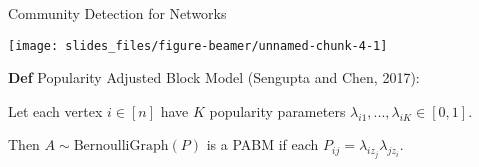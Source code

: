 \documentclass[
  ignorenonframetext,
]{beamer}
\begin{document}
\begin{frame}{Community Detection for Networks}
\protect\hypertarget{community-detection-for-networks}{}
\newcommand{\diag}{\text{diag}}
\newcommand{\tr}{\text{Tr}}
\newcommand{\blockdiag}{\text{blockdiag}}
\newcommand{\indep}{\stackrel{\text{ind}}{\sim}}
\newcommand{\iid}{\stackrel{\text{iid}}{\sim}}
\newcommand{\Bernoulli}{\text{Bernoulli}}
\newcommand{\Betadist}{\text{Beta}}
\newcommand{\BG}{\text{BernoulliGraph}}
\newcommand{\Cat}{\text{Categorical}}
\newcommand{\Uniform}{\text{Uniform}}
\newcommand{\RDPG}{\text{RDPG}}
\newcommand{\GRDPG}{\text{GRDPG}}
\newcommand{\PABM}{\text{PABM}}

\begin{center}\texttt{[image: slides\_files/figure-beamer/unnamed-chunk-4-1]} \end{center}

\textbf{Def} Popularity Adjusted Block Model (Sengupta and Chen, 2017):

Let each vertex \(i \in [n]\) have \(K\) popularity parameters
\(\lambda_{i1}, ..., \lambda_{iK} \in [0, 1]\).

Then \(A \sim \text{BernoulliGraph}(P)\) is a PABM if each
\(P_{ij} = \lambda_{i z_j} \lambda_{j z_i}\).
\end{frame}
\end{document}
